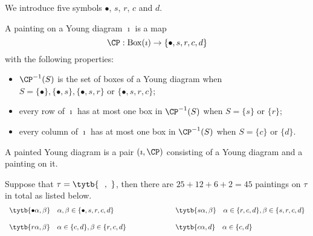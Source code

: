 \documentclass[ssunip.tex]{subfiles}
\begin{document}
We introduce five symbols $\bullet$, $s$, $r$, $c$ and $d$.
\begin{defn}
A painting on a Young diagram $\imath$ is a map
\[
  \CP: \mathrm{Box}(\imath) \rightarrow \{\bullet, s, r, c, d \}
\]
with the following properties:
\begin{itemize}
\item
 $\CP^{-1}(S)$ is the set of boxes of a Young diagram when $S=\{\bullet\}, \{\bullet, s \}, \{\bullet, s, r\}$ or $\{\bullet, s, r, c \} $;
 \item
 every row of $\imath$ has at most one  box in $\CP^{-1}(S)$ when $S=\{s\}$ or $ \{r\}$;
   \item
 every column of $\imath$ has at most one  box in $\CP^{-1}(S)$ when $S=\{c\}$ or $ \{d \}$.
 \end{itemize}
A painted Young diagram is a pair $(\imath, \CP)$ consisting of a Young diagram and a painting on it.

\end{defn}


\begin{Example} Suppose that $\tau=\tytb{\ \ ,\  }$, then there are $25+12+6+2=45$ paintings on $\tau$ in total as listed below.
\begin{equation*}\label{eq:sp-nsp.C}
\begin{array}{ll}
   \tytb{\bullet \alpha ,\beta } \quad \alpha, \beta\in \{\bullet, s,r,c,d\} \qquad \qquad  \qquad  & \tytb{s \alpha ,\beta } \quad \alpha\in \{r,c,d\}, \beta\in \{s,r,c,d\} \medskip \medskip \\
     \tytb{r \alpha ,\beta } \quad \alpha\in \{c,d\}, \beta\in \{r,c,d\} \qquad \qquad  \qquad
   &  \tytb{c \alpha , d } \quad  \alpha\in \{c,d\}
     \end{array}
  \end{equation*}

  \end{Example}
\end{document}
